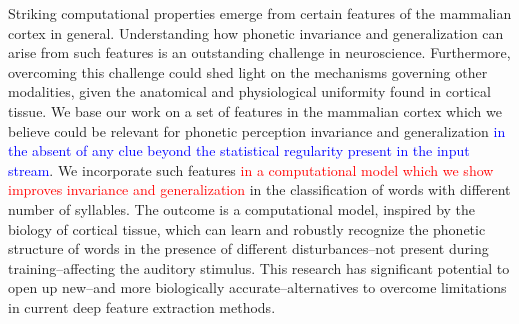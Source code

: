 \documentclass[10pt,letterpaper]{article}
\begin{document}

Striking computational properties emerge from certain features of the mammalian cortex in general. Understanding how phonetic invariance and generalization can arise from such features is an outstanding challenge in neuroscience. Furthermore, overcoming this challenge could shed light on the mechanisms governing other modalities, given the anatomical and physiological uniformity found in cortical tissue. We base our work on a set of features in the mammalian cortex which we believe could be relevant for phonetic perception invariance and generalization \textcolor{blue}{in the absent of any clue beyond the statistical regularity present in the input stream}. We incorporate such features \textcolor{red}{in a computational model which we show improves invariance and generalization} in the classification of words with different number of syllables. The outcome is a computational model, inspired by the biology of cortical tissue, which can learn and robustly recognize the phonetic structure of words in the presence of different disturbances--not present during training--affecting the auditory stimulus. This research has significant potential to open up new--and more biologically accurate--alternatives to overcome limitations in current deep feature extraction methods.
\end{document}
